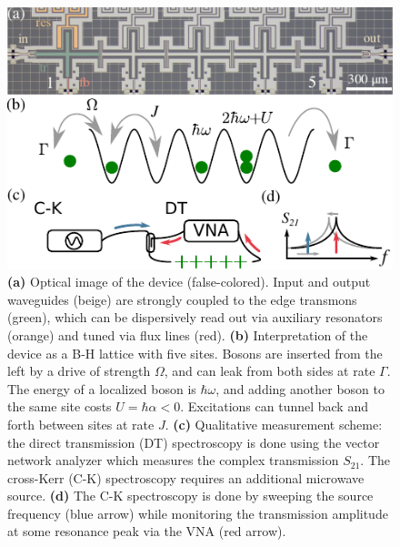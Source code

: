 \documentclass[%
 aps, pra,
 amsmath,amssymb,
 reprint,%
superscriptaddress
]{revtex4-2}
\begin{document}
\begin{figure}
	\centering
	\includegraphics[width=1\linewidth]{Pictures/scheme.pdf}
	\caption{\textbf{(a)} Optical image of the device (false-colored). Input and output waveguides (beige) are strongly coupled to the edge transmons (green), which can be dispersively read out via auxiliary resonators (orange) and tuned via flux lines (red). \textbf{(b)} Interpretation of the device as a B-H lattice with five sites. Bosons are inserted from the left by a drive of strength $\Omega$, and can leak from both sides at rate $\Gamma$. The energy of a localized boson is $\hbar \omega$, and adding another boson to the same site costs $U = \hbar \alpha < 0$. Excitations can tunnel back and forth between sites at rate $J$. \textbf{(c)} Qualitative measurement scheme: the direct transmission (DT) spectroscopy is done using the vector network analyzer which measures the complex transmission $ S_{21} $. The cross-Kerr (C-K) spectroscopy requires an additional microwave source. \textbf{(d)} The C-K spectroscopy is done by sweeping the source frequency (blue arrow) while monitoring the transmission amplitude at some resonance peak via the VNA (red arrow).}
	\label{fig:scheme}
\end{figure}
	
\end{document}

